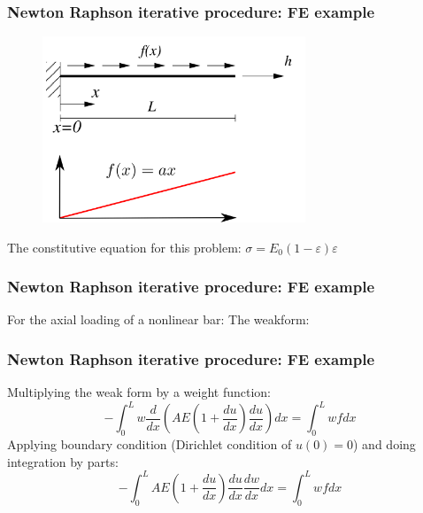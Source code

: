 \documentclass[notes]{beamer}
\begin{document}
\begin{frame}
\frametitle{Newton Raphson iterative procedure: FE example}
\begin{figure}[ht]
	\centering
	\includegraphics[width=0.7\textwidth]{figs/strong-form-nonlinear.png}
\end{figure}
The constitutive equation for this problem: $\sigma = E_0 (1 - \varepsilon)\varepsilon$
\end{frame}

\begin{frame}
\frametitle{Newton Raphson iterative procedure: FE example}
For the axial loading of a nonlinear bar:
The weakform:
\end{frame}

\begin{frame}
\frametitle{Newton Raphson iterative procedure: FE example}
Multiplying the weak form by a weight function:
	\begin{equation*}
		-\int_0^L w \frac{d}{dx}\left(AE\left(1 + \frac{du}{dx}\right)\frac{du}{dx}\right) dx = \int_0^L wf dx
	\end{equation*}
Applying boundary condition (Dirichlet condition of $u(0) = 0$) and doing integration by parts:	
	\begin{equation*}
		-\int_0^L AE\left(1 + \frac{du}{dx}\right)\frac{du}{dx} \frac{dw}{dx} dx = \int_0^L wf dx
	\end{equation*}
\end{frame}
\end{document}
